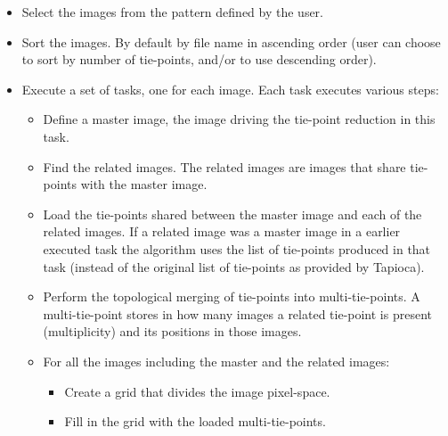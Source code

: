 \begin{itemize}
\item Select the images from the pattern defined by the user. 

\item Sort the images. By default by file name in ascending order (user can choose to sort by number of tie-points, and/or to use descending order). 

\item Execute a set of tasks, one for each image. Each task executes various steps:
   \begin{itemize}
   
   \item Define a master image, the image driving the tie-point reduction in this task.
   
   \item Find the related images. The related images are images that share tie-points with the master image. 
   
   \item Load the tie-points shared between the master image and each of the related images. If a related image was a master image in a earlier executed task the algorithm uses the list of tie-points produced in that task (instead of the original list of tie-points as provided by Tapioca).

   \item Perform the topological merging of tie-points into multi-tie-points. A multi-tie-point stores in how many images a related tie-point is present (multiplicity) and its positions in those images. 
   
   \item For all the images including the master and the related images: 
      \begin{itemize}
      \item Create a grid that divides the image pixel-space. 
      
      \item Fill in the grid with the loaded multi-tie-points.
      \end{itemize}      
      

\end{itemize}
\end{itemize}
